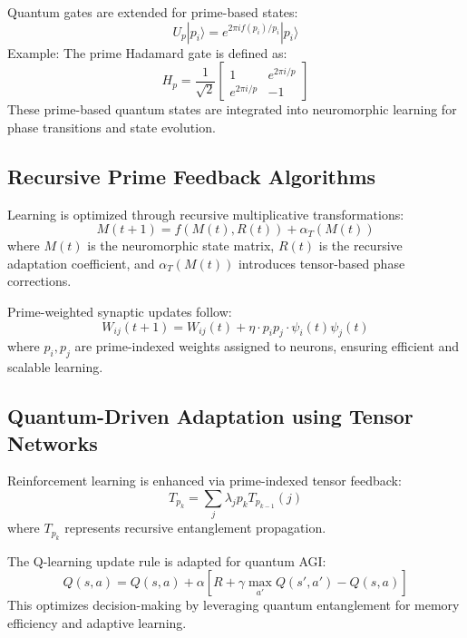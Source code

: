\documentclass{article}
\theoremstyle{plain}
\begin{document}
Quantum gates are extended for prime-based states:
\begin{equation}
U_p |p_i\rangle = e^{2\pi i f(p_i) / p_i} |p_i\rangle
\end{equation}
Example: The prime Hadamard gate is defined as:
\begin{equation}
H_p = \frac{1}{\sqrt{2}} \begin{bmatrix} 1 & e^{2\pi i/p} \\ e^{2\pi i/p} & -1 \end{bmatrix}
\end{equation}
These prime-based quantum states are integrated into neuromorphic learning for phase transitions and state evolution.

\subsection{Recursive Prime Feedback Algorithms}
Learning is optimized through recursive multiplicative transformations:
\begin{equation}
M(t+1) = f(M(t), R(t)) + \alpha_T(M(t))
\end{equation}
where $M(t)$ is the neuromorphic state matrix, $R(t)$ is the recursive adaptation coefficient, and $\alpha_T(M(t))$ introduces tensor-based phase corrections.

Prime-weighted synaptic updates follow:
\begin{equation}
W_{ij}(t+1) = W_{ij}(t) + \eta \cdot p_i p_j \cdot \psi_i(t) \psi_j(t)
\end{equation}
where $p_i, p_j$ are prime-indexed weights assigned to neurons, ensuring efficient and scalable learning.

\subsection{Quantum-Driven Adaptation using Tensor Networks}
Reinforcement learning is enhanced via prime-indexed tensor feedback:
\begin{equation}
T_{p_k} = \sum_{j} \lambda_j p_k T_{p_{k-1}}(j)
\end{equation}
where $T_{p_k}$ represents recursive entanglement propagation.

The Q-learning update rule is adapted for quantum AGI:
\begin{equation}
Q(s, a) = Q(s, a) + \alpha \left[ R + \gamma \max_{a'} Q(s', a') - Q(s, a) \right]
\end{equation}
This optimizes decision-making by leveraging quantum entanglement for memory efficiency and adaptive learning.
\end{document}
